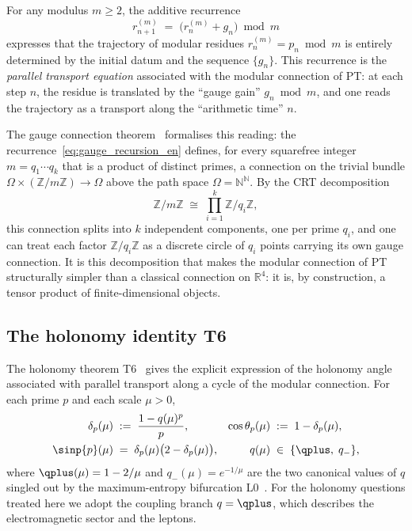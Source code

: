 For any modulus $m \geq 2$, the additive recurrence
\begin{equation}
  r_{n+1}^{(m)} \;=\; \bigl(r_n^{(m)} + g_n\bigr) \bmod m
  \label{eq:gauge_recursion_en}
\end{equation}
expresses that the trajectory of modular residues
$r_n^{(m)} = p_n \bmod m$ is entirely determined by the initial
datum and the sequence $\{g_n\}$. This recurrence is the
\emph{parallel transport equation} associated with the modular
connection of PT: at each step $n$, the residue is translated by
the ``gauge gain'' $g_n \bmod m$, and one reads the trajectory as
a transport along the ``arithmetic time'' $n$.

The gauge connection theorem~\cite[ch.~1, Thm.~gauge]{PT_Monograph}
formalises this reading: the
recurrence~\eqref{eq:gauge_recursion_en} defines, for every
squarefree integer $m = q_1 \cdots q_k$ that is a product of
distinct primes, a connection on the trivial bundle
$\Omega \times (\mathbb{Z}/m\mathbb{Z}) \to \Omega$ above the
path space $\Omega = \mathbb{N}^{\mathbb{N}}$. By the CRT
decomposition
\begin{equation}
  \mathbb{Z}/m\mathbb{Z}
  \;\cong\;
  \prod_{i=1}^{k} \mathbb{Z}/q_i\mathbb{Z},
  \label{eq:CRT_iso_en}
\end{equation}
this connection splits into $k$ independent components, one per
prime $q_i$, and one can treat each factor
$\mathbb{Z}/q_i\mathbb{Z}$ as a discrete circle of $q_i$ points
carrying its own gauge connection. It is this decomposition that
makes the modular connection of PT structurally simpler than a
classical connection on $\mathbb{R}^4$: it is, by construction,
a tensor product of finite-dimensional objects.

\subsection{The holonomy identity T6}
\label{ssec:T6_en}

The holonomy theorem T6~\cite[ch.~6]{PT_Monograph} gives the
explicit expression of the holonomy angle associated with parallel
transport along a cycle of the modular connection. For each prime
$p$ and each scale $\mu > 0$,
\begin{align}
  \delta_p(\mu) &\;:=\; \frac{1 - q(\mu)^p}{p},
  &
  \cos \theta_p(\mu) &\;:=\; 1 - \delta_p(\mu),
  \label{eq:delta_theta_en}
\\
  \sinp{p}(\mu) &\;=\; \delta_p(\mu)\bigl(2 - \delta_p(\mu)\bigr),
  &
  q(\mu) &\;\in\; \{\qplus,\; q_-\},
  \label{eq:sin2_theta_en}
\end{align}
where $\qplus(\mu) = 1 - 2/\mu$ and $q_-(\mu) = e^{-1/\mu}$ are
the two canonical values of $q$ singled out by the
maximum-entropy bifurcation L0~\cite[ch.~3]{PT_Monograph}. For the
holonomy questions treated here we adopt the coupling branch
$q = \qplus$, which describes the electromagnetic sector and the
leptons.

